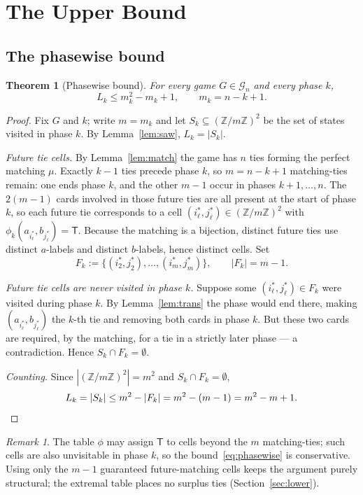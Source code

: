 \documentclass[11pt]{article}
\newtheorem{theorem}{Theorem}
\theoremstyle{definition}
\theoremstyle{remark}
\newtheorem{remark}{Remark}
\newcommand{\TT}{\mathsf{T}}
\newcommand{\Z}{\mathbb{Z}}
\begin{document}
\section{The Upper Bound}\label{sec:upper}
\subsection{The phasewise bound}
\begin{theorem}[Phasewise bound]\label{thm:phasewise}
For every game $G \in \mathcal G_n$ and every phase $k$,
\begin{equation}\label{eq:phasewise}
L_k \le m_k^2 - m_k + 1, \qquad m_k = n - k + 1.
\end{equation}
\end{theorem}
\begin{proof}
Fix $G$ and $k$; write $m = m_k$ and let $S_k \subseteq (\Z/m\Z)^2$ be the set of states visited in phase $k$. By
Lemma~\ref{lem:saw}, $L_k = |S_k|$.

\emph{Future tie cells.} By Lemma~\ref{lem:match} the game has $n$ ties forming the perfect matching $\mu$. Exactly
$k - 1$ ties precede phase $k$, so $m = n - k + 1$ matching-ties remain: one ends phase $k$, and the other $m - 1$
occur in phases $k+1, \dots, n$. The $2(m - 1)$ cards involved in those future ties are all present at the start of
phase $k$, so each future tie corresponds to a cell $(i^*_\ell, j^*_\ell) \in (\Z/m\Z)^2$ with
$\phi_k(a_{i^*_\ell}, b_{j^*_\ell}) = \TT$. Because the matching is a bijection, distinct future ties use distinct
$a$-labels and distinct $b$-labels, hence distinct cells. Set
\begin{equation}
F_k := \{(i^*_2, j^*_2), \dots, (i^*_m, j^*_m)\}, \qquad |F_k| = m - 1.
\end{equation}

\emph{Future tie cells are never visited in phase $k$.} Suppose some $(i^*_\ell, j^*_\ell) \in F_k$ were visited during
phase $k$. By Lemma~\ref{lem:trans} the phase would end there, making $(a_{i^*_\ell}, b_{j^*_\ell})$ the $k$-th tie and
removing both cards in phase $k$. But these two cards are required, by the matching, for a tie in a strictly later
phase --- a contradiction. Hence $S_k \cap F_k = \emptyset$.

\emph{Counting.} Since $|(\Z/m\Z)^2| = m^2$ and $S_k \cap F_k = \emptyset$,
\[
L_k = |S_k| \le m^2 - |F_k| = m^2 - (m - 1) = m^2 - m + 1. \qedhere
\]
\end{proof}

\begin{remark}
The table $\phi$ may assign $\TT$ to cells beyond the $m$ matching-ties; such cells are also unvisitable in phase $k$,
so the bound~\eqref{eq:phasewise} is conservative. Using only the $m - 1$ guaranteed future-matching cells keeps the
argument purely structural; the extremal table places no surplus ties (Section~\ref{sec:lower}).
\end{remark}
\end{document}

